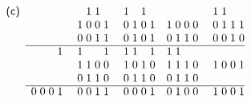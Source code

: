 \[\begin{array}{lc@{\;}c@{\;}c@{\;}c@{\;}cc@{\;}c@{\;}c@{\;}c@{\;}cc@{\;}c@{\;}c@{\;}cc@{}c@{\;}c@{\;}c@{\;}c@{\;}cc@{\;}c@{\;}c@{\;}c@{}}
\textsf{(c)} &  & & &  & &  &1&1&  & & 1& &1&  & &  & & &  & & 1&1& &\\
             &  & & &  & & 1&0&0&1 & & 0&1&0&1 & & 1&0&0&0 & & 0&1&1&1\\
             &  & & &  & & 0&0&1&1 & & 0&1&0&1 & & 0&1&1&0 & & 0&0&1&0\\
\cline{2-25}
             &  & & &1 & & 1& & &1 & & 1&1& &1 & & 1&1& &  & &  & & &\\
             &  & & &  & & 1&1&0&0 & & 1&0&1&0 & & 1&1&1&0 & & 1&0&0&1\\
             &  & & &  & & 0&1&1&0 & & 0&1&1&0 & & 0&1&1&0 & &  & & &\\
\cline{2-25}
             & 0&0&0&1 & & 0&0&1&1 & & 0&0&0&1 & & 0&1&0&0 & & 1&0&0&1
\end{array}
\]
